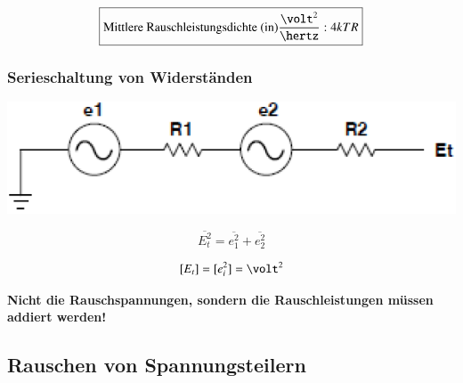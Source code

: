 $$ \boxed{ \text{Mittlere Rauschleistungsdichte (in)} \frac{\volt^2}{\hertz}:  4 k T R } $$ 


\subsubsection{Serieschaltung von Widerständen}

\begin{minipage}[c]{0.4\columnwidth}
    \includegraphics[width=\columnwidth]{images/serieschaltung_rauschende_widerstaende.png}
\end{minipage}
\hfill
\begin{minipage}[c]{0.58\columnwidth}
    \begin{minipage}[c]{0.48\columnwidth}
        $$ \boxed{ \overline{E_t^2} = \overline{e_1^2} + \overline{e_2^2} } $$
    \end{minipage}
    \hfill
    \begin{minipage}[c]{0.48\columnwidth}
        $$ [E_t] = [e_i^2] = \volt^2 $$
    \end{minipage}
\end{minipage}

\vspace{0.2cm}
\textbf{Nicht die Rauschspannungen, sondern die Rauschleistungen müssen addiert werden!} 


\subsection{Rauschen von Spannungsteilern}

